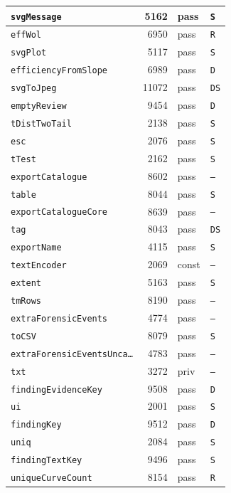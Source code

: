 {\begin{xltabular}{\linewidth}{|l|r|X|X|}
\texttt{svgMessage} & 5162 & pass & \texttt{S} \\ \hline
\texttt{effWol} & 6950 & pass & \texttt{R} \\ \hline
\texttt{svgPlot} & 5117 & pass & \texttt{S} \\ \hline
\texttt{efficiencyFromSlope} & 6989 & pass & \texttt{D} \\ \hline
\texttt{svgToJpeg} & 11072 & pass & \texttt{DS} \\ \hline
\texttt{emptyReview} & 9454 & pass & \texttt{D} \\ \hline
\texttt{tDistTwoTail} & 2138 & pass & \texttt{S} \\ \hline
\texttt{esc} & 2076 & pass & \texttt{S} \\ \hline
\texttt{tTest} & 2162 & pass & \texttt{S} \\ \hline
\texttt{exportCatalogue} & 8602 & pass & \texttt{--} \\ \hline
\texttt{table} & 8044 & pass & \texttt{S} \\ \hline
\texttt{exportCatalogueCore} & 8639 & pass & \texttt{--} \\ \hline
\texttt{tag} & 8043 & pass & \texttt{DS} \\ \hline
\texttt{exportName} & 4115 & pass & \texttt{S} \\ \hline
\texttt{textEncoder} & 2069 & const & \texttt{--} \\ \hline
\texttt{extent} & 5163 & pass & \texttt{S} \\ \hline
\texttt{tmRows} & 8190 & pass & \texttt{--} \\ \hline
\texttt{extraForensicEvents} & 4774 & pass & \texttt{--} \\ \hline
\texttt{toCSV} & 8079 & pass & \texttt{S} \\ \hline
\texttt{extraForensicEventsUnca…} & 4783 & pass & \texttt{--} \\ \hline
\texttt{txt} & 3272 & priv & \texttt{--} \\ \hline
\texttt{findingEvidenceKey} & 9508 & pass & \texttt{D} \\ \hline
\texttt{ui} & 2001 & pass & \texttt{S} \\ \hline
\texttt{findingKey} & 9512 & pass & \texttt{D} \\ \hline
\texttt{uniq} & 2084 & pass & \texttt{S} \\ \hline
\texttt{findingTextKey} & 9496 & pass & \texttt{S} \\ \hline
\texttt{uniqueCurveCount} & 8154 & pass & \texttt{R} \\ \hline

\end{xltabular}}
